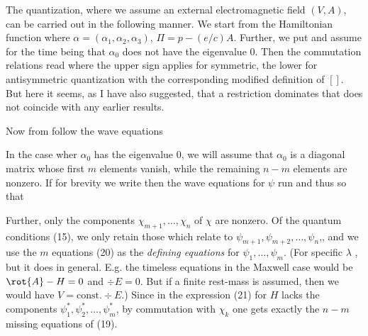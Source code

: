 The quantization, where we assume an external electromagnetic field $(V,A)$, can be carried out in the following manner. We start from the Hamiltonian function
where $\alpha=(\alpha_1,\alpha_2,\alpha_3)$, $\Pi=p-(e/c)A$. Further, we put
and assume for the time being that $\alpha_0$ does not have the eigenvalue 0. Then the commutation relations read
where the upper sign applies for symmetric, the lower for antisymmetric quantization with the corresponding modified definition of $[]$. But here it seems, as I have also suggested, that a restriction dominates that does not coincide with any earlier results.

Now from
follow the wave equations

In the case wher $\alpha_0$ has the eigenvalue 0, we will assume that $\alpha_0$ is a diagonal matrix whose first $m$ elements vanish, while the remaining $n-m$ elements are nonzero. If for brevity we write
then the wave equations for $\psi$ run
and thus
so that 

Further, only the components $\chi_{m+1},\dots,\chi_n$ of $\chi$ are nonzero. Of the quantum conditions (15), we only retain those which relate to $\psi_{m+1}, \psi_{m+2},\dots, \psi_n$,, and we use the $m$ equations (20) as the \textit{defining equations} for $\psi_1,\dots,\psi_m$. (For specific $\lambda$ , but it does in general. E.g. the timeless equations in the Maxwell case would be $\rot{A} - H = 0$ and $\div{E} = 0$. But if a finite rest-mass is assumed, then we would have $V= \text{const.}\div{E}$.) Since in the expression (21) for $H$ lacks the components $\psi_1^*, \psi_2^*, \dots, \psi_m^*$, by commutation with $\chi_k$ one gets exactly the $n-m$ missing equations of (19).


